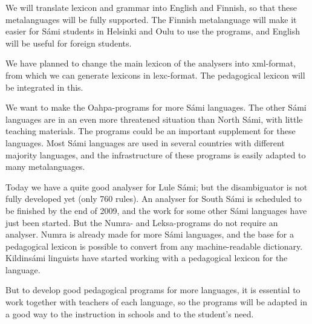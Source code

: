 \documentclass[a4paper,12pt]{article}
\begin{document}
We will translate lexicon and grammar into English and Finnish, so that these metalanguages will be fully supported. The Finnish metalanguage will make it easier for Sámi students in Helsinki and Oulu to use the programs, and English will be useful for foreign students.

We have planned to change the main lexicon of the analysers into xml-format, from which we can generate lexicons in lexc-format. The pedagogical lexicon will be integrated in this. 

We want to make the Oahpa-programs for more Sámi languages. The other Sámi languages are in an even more threatened situation than North Sámi, with little teaching materials. The programs could be an important supplement for these languages. Most Sámi languages are used in several countries with different majority languages, and the infrastructure of these programs is easily adapted to many metalanguages.

Today we have a quite good analyser for Lule Sámi; but the disambiguator is not fully developed yet (only 760 rules). An analyser for South Sámi is scheduled to be finished by the end of 2009, and the work for some other Sámi languages have just been started. But the Numra- and Leksa-programs do not require an analyser. Numra is already made for more Sámi languages, and the base for a pedagogical lexicon is possible to convert from any machine-readable dictionary. Kildinsámi linguists have started working with a pedagogical lexicon for the language. 

But to develop good pedagogical programs for more languages, it is essential to work together with teachers of each language, so the programs will be adapted in a good way to the instruction in schools and to the student's need.

\newpage

\par



	
\end{document}
